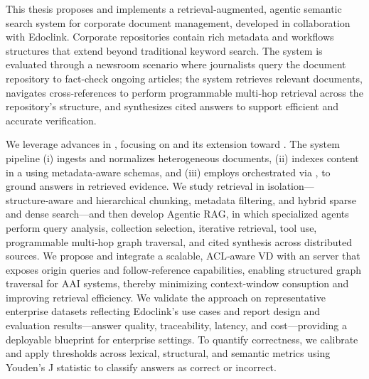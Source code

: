 \glsresetall
\noindent  
This thesis proposes and implements a retrieval‑augmented, agentic semantic search system for corporate document management, developed in collaboration with Edoclink. Corporate repositories contain rich metadata and workflows structures that extend beyond traditional keyword search.
The system is evaluated through a newsroom scenario  where journalists query the document repository to fact‑check ongoing articles; the system retrieves relevant documents, navigates cross‑references to perform programmable multi‑hop retrieval across the repository’s structure, and synthesizes cited answers to support efficient and accurate verification.

We leverage advances in , focusing on  and its extension toward . The system pipeline (i) ingests and normalizes heterogeneous documents, (ii) indexes content in a  using metadata‑aware schemas, and (iii) employs  orchestrated via , to ground answers in retrieved evidence. We study retrieval in isolation—structure‑aware and hierarchical chunking, metadata filtering, and hybrid sparse and dense search—and then develop Agentic RAG, in which specialized agents perform query analysis, collection selection, iterative retrieval, tool use, programmable multi‑hop graph traversal, and cited synthesis across distributed sources.
We propose and integrate a scalable, ACL‑aware \gls{VD} with an  server that exposes origin queries and follow‑reference capabilities, enabling structured graph traversal for \gls{AAI} systems, thereby minimizing context‑window consuption and improving retrieval efficiency. We validate the approach on representative enterprise datasets reflecting Edoclink’s use cases and report design and evaluation results—answer quality, traceability, latency, and cost—providing a deployable blueprint for enterprise settings. To quantify correctness, we calibrate and apply thresholds across lexical, structural, and semantic metrics using Youden’s J statistic to classify answers as correct or incorrect.






